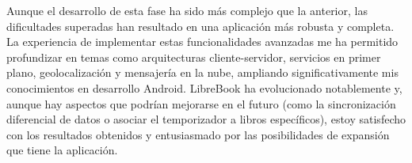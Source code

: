 \documentclass[a4paper,11pt]{report}
\begin{document}
        Aunque el desarrollo de esta fase ha sido más complejo que la anterior, las dificultades superadas han resultado en una aplicación más robusta y completa. La experiencia de implementar estas funcionalidades avanzadas me ha permitido profundizar en temas como arquitecturas cliente-servidor, servicios en primer plano, geolocalización y mensajería en la nube, ampliando significativamente mis conocimientos en desarrollo Android. LibreBook ha evolucionado notablemente y, aunque hay aspectos que podrían mejorarse en el futuro (como la sincronización diferencial de datos o asociar el temporizador a libros específicos), estoy satisfecho con los resultados obtenidos y entusiasmado por las posibilidades de expansión que tiene la aplicación.
  \printbibliography[title=Bibliografía]
\end{document}
